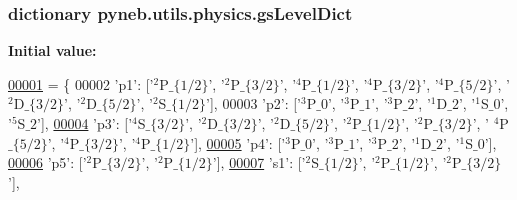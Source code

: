\subsubsection[{gs\+Level\+Dict}]{\setlength{\rightskip}{0pt plus 5cm}dictionary pyneb.\+utils.\+physics.\+gs\+Level\+Dict}\label{namespacepyneb_1_1utils_1_1physics_a18b749f74e825f8a60744ecba2078ce2}
{\bfseries Initial value\+:}
\begin{DoxyCode}
\hypertarget{namespacepyneb_1_1utils_1_1physics_l00001}{}\hyperlink{namespacepyneb_1_1utils_1_1physics}{00001} = \{
00002             \textcolor{stringliteral}{'p1'}: [\textcolor{stringliteral}{'$^2$P$\_\{1/2\}$'}, \textcolor{stringliteral}{'$^2$P$\_\{3/2\}$'}, \textcolor{stringliteral}{'$^4$P$\_\{1/2\}$'}, \textcolor{stringliteral}{'$^4$P$\_\{3/2\}$'}, \textcolor{stringliteral}{'$^4$P$\_\{5/2\}$'}, \textcolor{stringliteral}{'
      $^2$D$\_\{3/2\}$'}, \textcolor{stringliteral}{'$^2$D$\_\{5/2\}$'}, \textcolor{stringliteral}{'$^2$S$\_\{1/2\}$'}],
00003             \textcolor{stringliteral}{'p2'}: [\textcolor{stringliteral}{'$^3$P$\_0$'}, \textcolor{stringliteral}{'$^3$P$\_1$'}, \textcolor{stringliteral}{'$^3$P$\_2$'}, \textcolor{stringliteral}{'$^1$D$\_2$'}, \textcolor{stringliteral}{'$^1$S$\_0$'}, \textcolor{stringliteral}{'$^5$S$\_2$'}],
\hypertarget{namespacepyneb_1_1utils_1_1physics_l00004}{}\hyperlink{classpyneb_1_1utils_1_1physics_1_1_c_s_t}{00004}             \textcolor{stringliteral}{'p3'}: [\textcolor{stringliteral}{'$^4$S$\_\{3/2\}$'}, \textcolor{stringliteral}{'$^2$D$\_\{3/2\}$'}, \textcolor{stringliteral}{'$^2$D$\_\{5/2\}$'}, \textcolor{stringliteral}{'$^2$P$\_\{1/2\}$'}, \textcolor{stringliteral}{'$^2$P$\_\{3/2\}$'}, \textcolor{stringliteral}{'
      $^4$P$\_\{5/2\}$'}, \textcolor{stringliteral}{'$^4$P$\_\{3/2\}$'}, \textcolor{stringliteral}{'$^4$P$\_\{1/2\}$'}],
\hypertarget{namespacepyneb_1_1utils_1_1physics_l00005}{}\hyperlink{classpyneb_1_1utils_1_1physics_1_1_c_s_t_aee0d21a1f9edd72e75c5369bd5bc36b9}{00005}             \textcolor{stringliteral}{'p4'}: [\textcolor{stringliteral}{'$^3$P$\_0$'}, \textcolor{stringliteral}{'$^3$P$\_1$'}, \textcolor{stringliteral}{'$^3$P$\_2$'}, \textcolor{stringliteral}{'$^1$D$\_2$'}, \textcolor{stringliteral}{'$^1$S$\_0$'}],
\hypertarget{namespacepyneb_1_1utils_1_1physics_l00006}{}\hyperlink{classpyneb_1_1utils_1_1physics_1_1_c_s_t_a316a5d8a7c983441bd40589f040f3a09}{00006}             \textcolor{stringliteral}{'p5'}: [\textcolor{stringliteral}{'$^2$P$\_\{3/2\}$'}, \textcolor{stringliteral}{'$^2$P$\_\{1/2\}$'}],
\hypertarget{namespacepyneb_1_1utils_1_1physics_l00007}{}\hyperlink{classpyneb_1_1utils_1_1physics_1_1_c_s_t_a00251eede3f56eadeb766c97f3144c55}{00007}             \textcolor{stringliteral}{'s1'}: [\textcolor{stringliteral}{'$^2$S$\_\{1/2\}$'}, \textcolor{stringliteral}{'$^2$P$\_\{1/2\}$'}, \textcolor{stringliteral}{'$^2$P$\_\{3/2\}$'}],

\end{DoxyCode}
